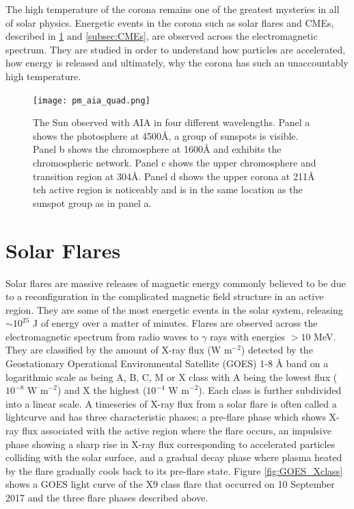 The high temperature of the corona remains one of the greatest mysteries in all of solar physics. Energetic events in the corona such as solar flares and CMEs, described in \ref{subsec:sf} and \ref{subsec:CMEs}, are observed across the electromagnetic spectrum. They are studied in order to understand how particles are accelerated, how energy is released and ultimately, why the corona has such an unaccountably high temperature.

\begin{figure}[ht]
\centering
\texttt{[image: pm\_aia\_quad.png]}
\caption[The solar atmosphere at different wavelengths.]{The Sun observed with AIA in four different wavelengths. Panel a shows the photosphere at 4500{\AA}, a group of sunspots is visible. Panel b shows the chromosphere at 1600{\AA} and exhibits the chromospheric network. Panel c shows the upper chromosphere and transition region at 304{\AA}. Panel d shows the upper corona at 211{\AA} teh active region is noticeably and is in the same location as the sunspot group as in panel a.}
\label{fig:aia_quad}
\end{figure}

\section{Solar Flares}
\label{subsec:sf}
Solar flares are massive releases of magnetic energy commonly believed to be due to a reconfiguration in the complicated magnetic field structure in an active region.  They are some of the most energetic events in the solar system, releasing $\sim 10^{25}$ J of energy over a matter of minutes. Flares are observed across the electromagnetic spectrum from radio waves to $\gamma$ rays with energies $> 10$ MeV. They are classified by the amount of X-ray flux (W m$^{-2}$) detected by the Geostationary Operational Environmental Satellite (GOES) 1-8 {\AA} band on a logarithmic scale as being A, B, C, M or X class with A being the lowest flux ($10^{-8} \mbox{ W m}^{-2}$) and X the highest ($10^{-4} \mbox{ W m}^{-2}$). Each class is further subdivided into a linear scale.
A timeseries of X-ray flux from a solar flare is often called a lightcurve and has three characteristic phases; a pre-flare phase which shows X-ray flux associated with the active region where the flare occurs, an impulsive phase showing a sharp rise in X-ray flux corresponding to accelerated particles colliding with the solar surface, and a gradual decay phase where plasma heated by the flare gradually cools back to its pre-flare state. Figure \ref{fig:GOES_Xclass} shows a GOES light curve of the X9 class flare that occurred on 10 September 2017 and the three flare phases described above.

